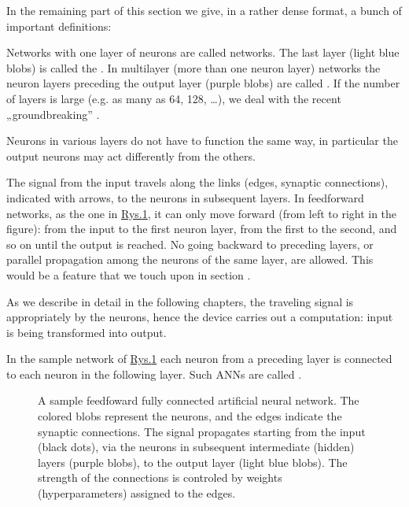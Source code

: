 \documentclass[a4paper,12pt,polish]{jupyterBook}
\let\sphinxpxdimen\pdfpxdimen\else\newdimen\sphinxpxdimen
\begin{document}
\sphinxAtStartPar
In the remaining part of this section we give, in a rather dense format, a bunch of important definitions:

\sphinxAtStartPar
Networks with one layer of neurons are called  networks. The last layer (light blue blobs) is called the . In multi\sphinxhyphen{}layer (more than one neuron layer) networks the neuron layers preceding the output layer (purple blobs) are called . If the number of layers is large (e.g. as many as 64, 128, …), we deal with the recent „ground\sphinxhyphen{}breaking” .

\sphinxAtStartPar
Neurons in various layers do not have to function the same way, in particular the output neurons may act differently from the others.

\sphinxAtStartPar
The signal from the input travels along the links (edges, synaptic connections), indicated with arrows, to the neurons in subsequent layers. In feed\sphinxhyphen{}forward networks, as the one in \hyperref[\detokenize{docs/intro:ffnn-fig}]{Rys.\@ \ref{\detokenize{docs/intro:ffnn-fig}}}, it can only move forward (from left to right in the figure): from the input to the first neuron layer, from the first to the second, and so on until the output is reached. No going backward to preceding layers, or parallel propagation among the neurons of the same layer, are allowed. This would be a  feature that we touch upon in section {\hyperref[\detokenize{docs/som:lat-lab}]{}}.

\sphinxAtStartPar
As we describe in detail in the following chapters, the traveling signal is appropriately  by the neurons, hence the device carries out a computation: input is being transformed into output.

\sphinxAtStartPar
In the sample network of \hyperref[\detokenize{docs/intro:ffnn-fig}]{Rys.\@ \ref{\detokenize{docs/intro:ffnn-fig}}} each neuron from a preceding layer is connected to each neuron in the following layer. Such ANNs are called .

\begin{figure}[htbp]
\centering
\capstart

\noindent\sphinxincludegraphics[width=300\sphinxpxdimen]{{feed_f}.png}
\caption{A sample feed\sphinxhyphen{}foward fully connected artificial neural network. The colored blobs represent the neurons, and the edges indicate the synaptic connections. The signal propagates starting from the input (black dots), via the neurons in subsequent intermediate (hidden) layers (purple blobs), to the output layer (light blue blobs). The strength of the connections is controled by weights (hyperparameters) assigned to the edges.}\label{\detokenize{docs/intro:ffnn-fig}}\end{figure}
\end{document}
